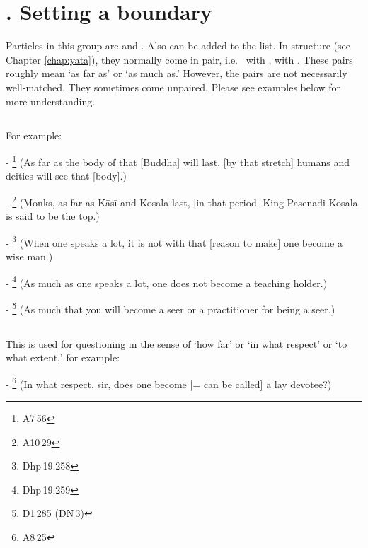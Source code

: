 \label{nipgrp9}
\section*{. Setting a boundary}

Particles in this group are  and . Also  can be added to the list. In  structure (see Chapter \ref{chap:yata}), they normally come in pair, i.e.\  with ,  with . These pairs roughly mean `as far as' or `as much as.' However, the pairs are not necessarily well-matched. They sometimes come unpaired. Please see examples below for more understanding.

\subsection*{}\label{nip:yaava}\label{nip:taava}
For example:\par
- \footnote{A7\,56} (As far as the body of that [Buddha] will last, [by that stretch] humans and deities will see that [body].) \par
- \footnote{A10\,29} (Monks, as far as K\=as\=i and Kosala last, [in that period] King Pasenadi Kosala is said to be the top.) \par
- \footnote{Dhp\,19.258} (When one speaks a lot, it is not with that [reason to make] one become a wise man.) \par
- \footnote{Dhp\,19.259} (As much as one speaks a lot, one does not become a teaching holder.) \par
- \footnote{D1\,285 (DN\,3)} (As much that you will become a seer or a practitioner for being a seer.) \par

\subsection*{}\label{nip:kittaavataa}
This is used for questioning in the sense of `how far' or `in what respect' or `to what extent,' for example:\par
- \footnote{A8\,25} (In what respect, sir, does one become [= can be called] a lay devotee?) \par

